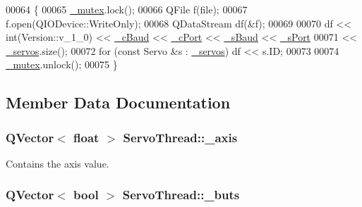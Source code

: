 \begin{DoxyCode}
00064 \{
00065     \hyperlink{class_servo_thread_a6327eafc0dac189ec1b202d63ef32457}{\_mutex}.lock();
00066     QFile f(file);
00067     f.open(QIODevice::WriteOnly);
00068     QDataStream df(&f);
00069     
00070     df << int(Version::v\_1\_0) << \hyperlink{class_servo_thread_a9fccfd415e2e55c8abef7fcc6535af30}{\_cBaud} << \hyperlink{class_servo_thread_ab52437b31a433c427a6c050f2b1cc959}{\_cPort} << \hyperlink{class_servo_thread_a5b9a41b9e271275b914affb0a845a2ee}{\_sBaud} << 
      \hyperlink{class_servo_thread_ac9a614aa1518efb49b0a06636bd1bdbf}{\_sPort}
00071        << \hyperlink{class_servo_thread_a1ac6662fe6d198b5971ae0ffa7ddfcfd}{\_servos}.size();    
00072     \textcolor{keywordflow}{for} (\textcolor{keyword}{const} Servo &s : \hyperlink{class_servo_thread_a1ac6662fe6d198b5971ae0ffa7ddfcfd}{\_servos}) df << s.ID;
00073     
00074     \hyperlink{class_servo_thread_a6327eafc0dac189ec1b202d63ef32457}{\_mutex}.unlock();
00075 \}
\end{DoxyCode}


\subsection{Member Data Documentation}
\hypertarget{class_servo_thread_aad24ef961ee39dd35766c725c13b11b7}{}
\subsubsection[{\+\_\+axis}]{\setlength{\rightskip}{0pt plus 5cm}Q\+Vector$<$ float $>$ Servo\+Thread\+::\+\_\+axis\hspace{0.3cm}{\ttfamily [private]}}\label{class_servo_thread_aad24ef961ee39dd35766c725c13b11b7}


Contains the axis value. 

\hypertarget{class_servo_thread_a6f956f7e0f2953e213ff95fb64857ab0}{}
\subsubsection[{\+\_\+buts}]{\setlength{\rightskip}{0pt plus 5cm}Q\+Vector$<$ bool $>$ Servo\+Thread\+::\+\_\+buts\hspace{0.3cm}{\ttfamily [private]}}\label{class_servo_thread_a6f956f7e0f2953e213ff95fb64857ab0}


